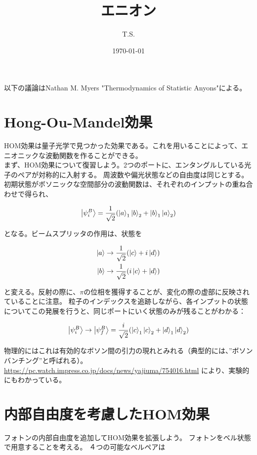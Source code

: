 \documentclass[a4paper,11pt]{jsarticle}
\numberwithin{equation}{section}
\begin{document}
\title{エニオン}
\author{T.S.}
\date{\today}
\maketitle
\tableofcontents

以下の議論はNathan M. Myers "Thermodynamics of Statistic Anyons"による。\\

\section{Hong-Ou-Mandel効果}
HOM効果は量子光学で見つかった効果である。これを用いることによって、エニオニックな波動関数を作ることができる。\\
まず、HOM効果について復習しよう。2つのポートに、エンタングルしている光子のペアが対称的に入射する。
周波数や偏光状態などの自由度は同じとする。
初期状態がボソニックな空間部分の波動関数は、それぞれのインプットの重ね合わせで得られ、

\begin{align}
\ket{\psi_i^B}=\frac{1}{\sqrt{2}}(\ket{a}_1\ket{b}_2+\ket{b}_1\ket{a}_2)
\end{align}

となる。ビームスプリッタの作用は、状態を

\begin{align}
\ket{a}\to\frac{1}{\sqrt{2}}(\ket{c}+i\ket{d})\\
\ket{b}\to\frac{1}{\sqrt{2}}(i\ket{c}+\ket{d})
\end{align}

と変える。反射の際に、$\pi$の位相を獲得することが、変化の際の虚部に反映されていることに注意。
粒子のインデックスを追跡しながら、各インプットの状態についてこの発展を行うと、同じポートにいく状態のみが残ることがわかる：

\begin{align}
\ket{\psi_i^B}\to\ket{\psi_f^B}=\frac{i}{\sqrt{2}}(\ket{c}_1\ket{c}_2+\ket{d}_1\ket{d}_2)
\end{align}

物理的にはこれは有効的なボソン間の引力の現れとみれる（典型的には、”ボソンバンチング”と呼ばれる）。
\url{https://pc.watch.impress.co.jp/docs/news/yajiuma/754016.html} により、実験的にもわかっている。

\section{内部自由度を考慮したHOM効果}
フォトンの内部自由度を追加してHOM効果を拡張しよう。
フォトンをベル状態で用意することを考える。
４つの可能なベルペアは
\end{document}
